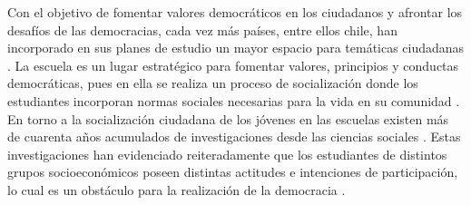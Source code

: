 \documentclass[12pt,twoside]{templates/facsothesis}
\begin{document}
Con el objetivo de fomentar valores democráticos en los ciudadanos y afrontar los desafíos de las democracias, cada vez más países, entre ellos chile, han incorporado en sus planes de estudio un mayor espacio para temáticas ciudadanas \citep{keerCiudadaniaNivelNacional2015}. La escuela es un lugar estratégico para fomentar valores, principios y conductas democráticas, pues en ella se realiza un proceso de socialización donde los estudiantes incorporan normas sociales necesarias para la vida en su comunidad \citep{durkheimEducacionSociologia2010}. En torno a la socialización ciudadana de los jóvenes en las escuelas existen más de cuarenta años acumulados de investigaciones desde las ciencias sociales \citep{torneyCrossnationalPoliticalSocialization1979}. Estas investigaciones han evidenciado reiteradamente que los estudiantes de distintos grupos socioeconómicos poseen distintas actitudes e intenciones de participación, lo cual es un obstáculo para la realización de la democracia \citep{informeiccs2011, castilloSocialInequalityChanges2014, mirandaDesigualdadCiudadaniaAproximacion2018, ferransCivicCompetenceGaps2017, trevinoInfluenceTeachersSchools2017}.
\end{document}
